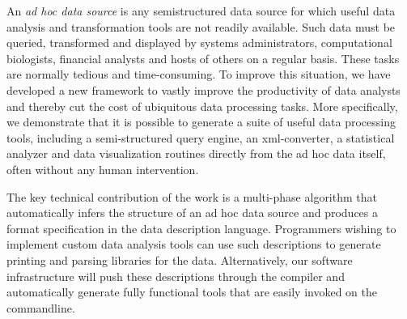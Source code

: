 An {\em ad hoc data source} is any semistructured data source for
which useful data analysis and transformation tools are not 
readily available.  Such data must be queried, transformed and displayed by
systems administrators, computational biologists, financial analysts
and hosts of others on a regular basis.  These tasks are
normally tedious and time-consuming.  To improve this situation, we have
developed a new framework to vastly improve the productivity of data
analysts and thereby cut the cost of ubiquitous data processing tasks.
More specifically, we demonstrate that it is possible to generate a suite
of useful data processing tools, including a semi-structured query
engine, an xml-converter, a statistical analyzer and data
visualization routines directly from the ad hoc data itself, often
without any human intervention.  

The key technical contribution of the work is a multi-phase algorithm
that automatically infers the structure of an ad hoc data source and
produces a format specification in the \pads{} data description
language.  Programmers wishing to implement custom data analysis tools
can use such descriptions to generate printing and parsing libraries
for the data.  Alternatively,  our software infrastructure will
push these descriptions through the \pads{} compiler and automatically
generate fully functional tools that are easily invoked on the
commandline.
